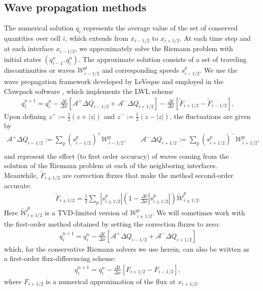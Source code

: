 \documentclass[preprint, 11pt]{article}
\newcommand{\W}{{\mathcal W}}
\newcommand{\A}{{\mathcal A}}
\newcommand{\apdq}{\A^+ \!\!{\Delta} Q}
\newcommand{\amdq}{\A^- \!\!{\Delta} Q}
\newcommand{\Ft}{\tilde{F}}
\newcommand{\imh}{{i-1/2}}
\newcommand{\iph}{{i+1/2}}
\newcommand{\bfF}{{F}}
\begin{document}
\subsection{Wave propagation methods}\label{sec:waveprop}
The numerical solution $q_i$ represents the average value of the set of
conserved quantities over cell $i$, which extends from $x_\imh$ to $x_\iph$.
At each time step and at each interface $x_\imh$, we approximately solve the
Riemann problem with initial states $(q^n_{i-1},q^n_i)$.  The approximate
solution consists of a set of traveling discontinuities or waves $\W^p_\imh$
and corresponding speeds $s^p_\imh$.
We use the wave propagation framework developed by LeVeque \cite{leveque1997wave, leveque2002finite}
and employed in the Clawpack software \cite{clawpack,pyclaw-sisc}, which implements the LWL scheme
\begin{align}\label{second-order_via_fluct}
  q_i^{n+1} = q_i^n-\frac{\Delta t}{\Delta x}\left[\apdq_\imh+\amdq_\iph\right]
  -\frac{\Delta t}{\Delta x}\left[\tilde{F}_{i+1/2}-\tilde{F}_{i-1/2}\right],
\end{align}
Upon defining $z^+:=\frac{1}{2}(z+|z|)$ and $z^-:=\frac{1}{2}(z-|z|)$,
the fluctuations are given by
\begin{align}\label{fluct}
  \apdq_\imh := \sum_p\left(s_{i-1/2}^p\right)^+\W_{i-1/2}^p, \qquad
  \amdq_\iph := \sum_p\left(s_{i+1/2}^p\right)^-\W_{i+1/2}^p, \\
\end{align}
and represent the effect (to first
order accuracy) of waves coming from the solution of the Riemann problem at
each of the neighboring interfaces.  Meanwhile, $\Ft_{i\pm 1/2}$ are correction
fluxes that make the method second-order accurate:
\begin{align*}
  \tilde{F}_{i\pm 1/2}=\frac{1}{2}\sum_p|s_{i\pm 1/2}^p|\left(1-\frac{\Delta t}{\Delta x}|s_{i\pm 1/2}^p|\right)\tilde\W_{i\pm 1/2}^p.
\end{align*}
Here $\tilde{\W}_{i\pm 1/2}^p$ is a TVD-limited version of $\W_{i\pm 1/2}^p$.
We will sometimes work with
the first-order method obtained by setting the correction fluxes to zero:
\begin{align}\label{first-order_via_fluct}
  q_i^{n+1} = q_i^n-\frac{\Delta t}{\Delta x}\left[\apdq_\imh+\amdq_\iph\right]
\end{align}
which, for the conservative Riemann solvers we use herein, can also be written
as a first-order flux-differencing scheme:
\begin{align}\label{first-order_FV}
  q_i^{n+1}=q_i^n-\frac{\Delta t}{\Delta x}\left[\bfF_{i+1/2}-\bfF_{i-1/2}\right],
\end{align}
where $\bfF_{i+1/2}$ is a numerical approximation of the flux at $x_\iph$.
\end{document}
